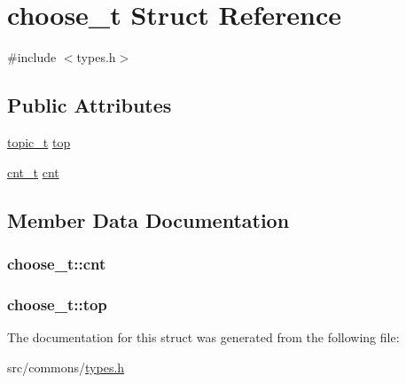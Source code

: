 \hypertarget{structchoose__t}{
\section{choose\_\-t Struct Reference}
\label{structchoose__t}
}


{\ttfamily \#include $<$types.h$>$}

\subsection*{Public Attributes}
\begin{DoxyCompactItemize}
\item 
\hyperlink{types_8h_a9e01813fe10a57a4b90b62ce9bab6433}{topic\_\-t} \hyperlink{structchoose__t_a42c057504d4bf6c660e385b0eacd7f48}{top}
\item 
\hyperlink{types_8h_a090b3bab5602157ebf706a44041dc05e}{cnt\_\-t} \hyperlink{structchoose__t_ab9aa15aeb3ef33dcf1e0184df2e4a560}{cnt}
\end{DoxyCompactItemize}


\subsection{Member Data Documentation}
\hypertarget{structchoose__t_ab9aa15aeb3ef33dcf1e0184df2e4a560}{
\subsubsection[{cnt}]{ {\bf choose\_\-t::cnt}}}
\label{structchoose__t_ab9aa15aeb3ef33dcf1e0184df2e4a560}
\hypertarget{structchoose__t_a42c057504d4bf6c660e385b0eacd7f48}{
\subsubsection[{top}]{ {\bf choose\_\-t::top}}}
\label{structchoose__t_a42c057504d4bf6c660e385b0eacd7f48}


The documentation for this struct was generated from the following file:\begin{DoxyCompactItemize}
\item 
src/commons/\hyperlink{types_8h}{types.h}\end{DoxyCompactItemize}
